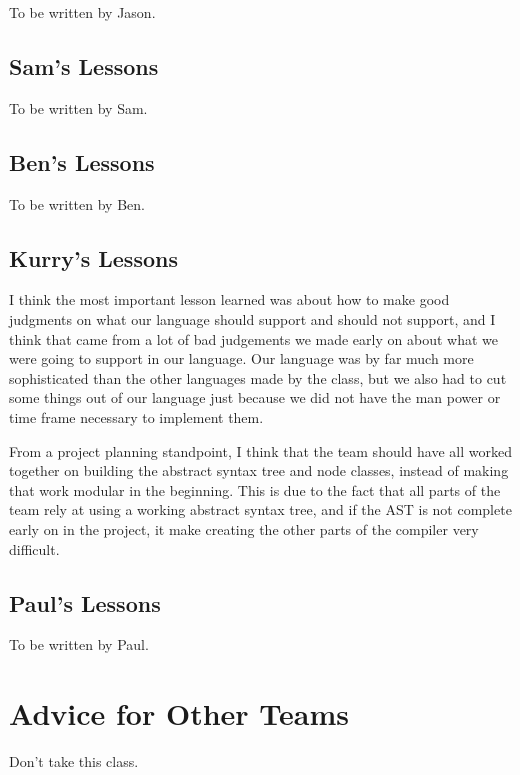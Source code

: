\documentclass{book}
\begin{document}
To be written by Jason.

\subsection{Sam's Lessons}
\label{sub:sams-lessons}

To be written by Sam.

\subsection{Ben's Lessons}
\label{sub:bens-lessons}

To be written by Ben.

\subsection{Kurry's Lessons}
\label{sub:kurrys-lessons}

I think the most important lesson learned was about how to make good judgments
on what our language should support and should not support, and I think that
came from a lot of bad judgements we made early on about what we were going to
support in our language. Our language was by far much more sophisticated than the
other languages made by the class, but we also had to cut some things out of our
language just because we did not have the man power or time frame necessary to
implement them. 

From a project planning standpoint, I think that the team should have all worked 
together on building the abstract syntax tree and node classes, instead of making
that work modular in the beginning. This is due to the fact that all parts of the team
rely at using a working abstract syntax tree, and if the AST is not complete early on
in the project, it make creating the other parts of the compiler very difficult. 



\subsection{Paul's Lessons}
\label{sub:pauls-lessons}

To be written by Paul.

\section{Advice for Other Teams}

Don't take this class.
\end{document}
